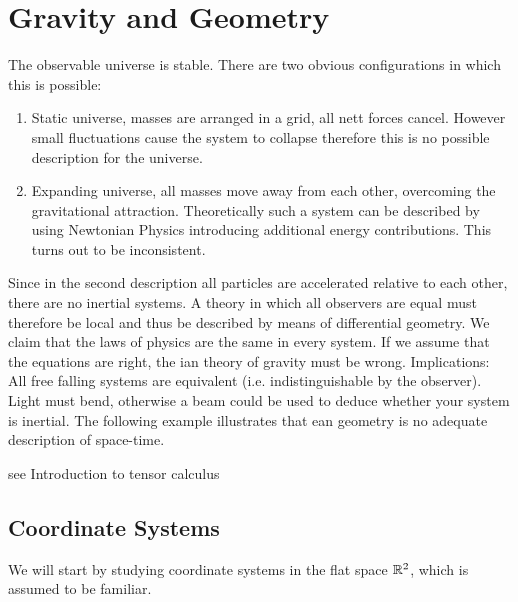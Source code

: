 \chapter{Gravity and Geometry}
The observable universe is stable. There are two obvious configurations in which this is possible:
\begin{enumerate}
    \item Static universe, masses are arranged in a grid, all nett forces cancel.
    However small fluctuations cause the system to collapse therefore this is
    no possible description for the universe. 
    \item Expanding universe, all masses move away from each other, overcoming the gravitational attraction.
    Theoretically such a system can be described by using Newtonian Physics introducing additional energy contributions.
    This turns out to be inconsistent.
\end{enumerate}
Since in the second description all particles are accelerated relative to each other, there are no inertial systems.
A theory in which all observers are equal must therefore be local and thus be described by means of differential geometry.
We claim that the laws of physics are the same in every system.
If we assume that the  equations are right, the
ian theory of gravity must be wrong.
Implications:
All free falling systems are equivalent (i.e. indistinguishable by the observer).
Light must bend, otherwise a beam could be used to deduce whether your system is inertial.
The following example illustrates that ean geometry is no
adequate description of space-time.
\begin{example}
see Introduction to tensor calculus
\end{example}
\section{Coordinate Systems}
We will start by studying coordinate systems in the flat space $\mathbb{R}^2$, which
is assumed to be familiar.
